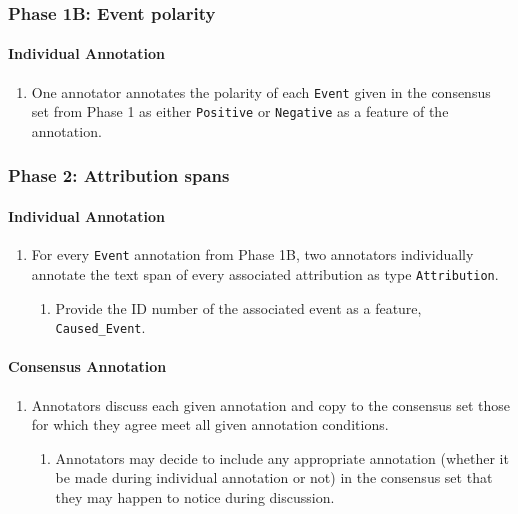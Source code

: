 \documentclass[a4paper,12pt]{article}
\begin{document}
    \subsubsection{Phase 1B: Event polarity}
    \paragraph{Individual Annotation}
        \begin{enumerate}
            \item One annotator annotates the polarity of each \texttt{Event} given in the consensus set from Phase 1 as either \texttt{Positive} or \texttt{Negative} as a feature of the annotation.
        \end{enumerate}

    \subsubsection{Phase 2: Attribution spans}
    \paragraph{Individual Annotation}
        \begin{enumerate}
            \item For every \texttt{Event} annotation from Phase 1B, two annotators individually annotate the text span of every associated attribution as type \texttt{Attribution}.
                \begin{enumerate}
                    \item Provide the ID number of the associated event as a feature, \texttt{Caused\_Event}.
                \end{enumerate}
        \end{enumerate}
    \paragraph{Consensus Annotation}
        \begin{enumerate}
            \item Annotators discuss each given annotation and copy to the consensus set those for which they agree meet all given annotation conditions.
                \begin{enumerate}
                    \item Annotators may decide to include any appropriate annotation (whether it be made during individual annotation or not) in the consensus set that they may happen to notice during discussion.
                \end{enumerate}
        \end{enumerate}
\end{document}
